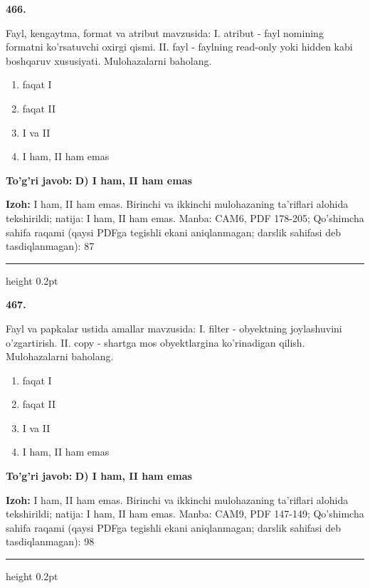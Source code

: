 \documentclass[10pt,a4paper]{article}
\begin{document}
{\bfseries\sffamily\color{ink} 466.}
\par
Fayl, kengaytma, format va atribut mavzusida: I. atribut - fayl nomining formatni ko'rsatuvchi oxirgi qismi. II. fayl - faylning read-only yoki hidden kabi boshqaruv xususiyati. Mulohazalarni baholang.
\begin{enumerate}[label=\Alph*),leftmargin=9mm]
\item faqat I
\item faqat II
\item I va II
\item I ham, II ham emas
\end{enumerate}
\begin{tcolorbox}[enhanced,breakable,colback=teal!4,colframe=teal!60!black,boxrule=0.45pt,arc=1.2mm,left=2.7mm,right=2.7mm,top=1.8mm,bottom=1.8mm,before skip=2mm,after skip=2mm]
{\bfseries\sffamily\color{teal}To'g'ri javob:} \textbf{D) I ham, II ham emas}
\par\smallskip
{\bfseries Izoh:} I ham, II ham emas. Birinchi va ikkinchi mulohazaning ta'riflari alohida tekshirildi; natija: I ham, II ham emas. Manba: CAM6, PDF 178-205; Qo'shimcha sahifa raqami (qaysi PDFga tegishli ekani aniqlanmagan; darslik sahifasi deb tasdiqlanmagan): 87
\end{tcolorbox}
\vspace{2mm}\hrule height 0.2pt\vspace{3mm}

{\bfseries\sffamily\color{ink} 467.}
\par
Fayl va papkalar ustida amallar mavzusida: I. filter - obyektning joylashuvini o'zgartirish. II. copy - shartga mos obyektlargina ko'rinadigan qilish. Mulohazalarni baholang.
\begin{enumerate}[label=\Alph*),leftmargin=9mm]
\item faqat I
\item faqat II
\item I va II
\item I ham, II ham emas
\end{enumerate}
\begin{tcolorbox}[enhanced,breakable,colback=teal!4,colframe=teal!60!black,boxrule=0.45pt,arc=1.2mm,left=2.7mm,right=2.7mm,top=1.8mm,bottom=1.8mm,before skip=2mm,after skip=2mm]
{\bfseries\sffamily\color{teal}To'g'ri javob:} \textbf{D) I ham, II ham emas}
\par\smallskip
{\bfseries Izoh:} I ham, II ham emas. Birinchi va ikkinchi mulohazaning ta'riflari alohida tekshirildi; natija: I ham, II ham emas. Manba: CAM9, PDF 147-149; Qo'shimcha sahifa raqami (qaysi PDFga tegishli ekani aniqlanmagan; darslik sahifasi deb tasdiqlanmagan): 98
\end{tcolorbox}
\vspace{2mm}\hrule height 0.2pt\vspace{3mm}
\end{document}
